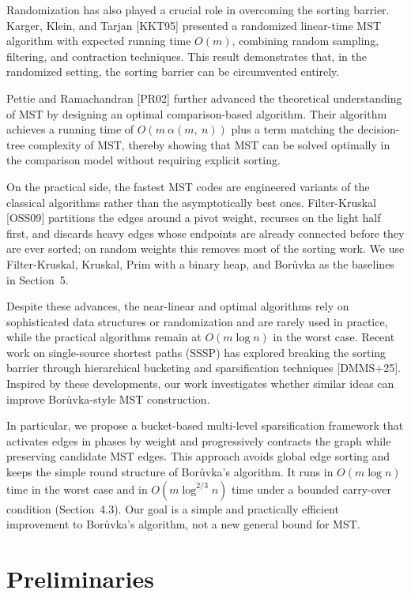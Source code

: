 \documentclass[11pt]{article}
\theoremstyle{plain}
\theoremstyle{remark}
\begin{document}
Randomization has also played a crucial role in overcoming the sorting
barrier. Karger, Klein, and Tarjan {[}KKT95{]} presented a randomized
linear-time MST algorithm with expected running time \(O(m)\), combining
random sampling, filtering, and contraction techniques. This result
demonstrates that, in the randomized setting, the sorting barrier can be
circumvented entirely.

Pettie and Ramachandran {[}PR02{]} further advanced the theoretical
understanding of MST by designing an optimal comparison-based algorithm.
Their algorithm achieves a running time of \(O(m\ \alpha(m,\ n))\) plus
a term matching the decision-tree complexity of MST, thereby showing
that MST can be solved optimally in the comparison model without
requiring explicit sorting.

On the practical side, the fastest MST codes are engineered variants of
the classical algorithms rather than the asymptotically best ones.
Filter-Kruskal {[}OSS09{]} partitions the edges around a pivot weight,
recurses on the light half first, and discards heavy edges whose
endpoints are already connected before they are ever sorted; on random
weights this removes most of the sorting work. We use Filter-Kruskal,
Kruskal, Prim with a binary heap, and Borůvka as the baselines in
Section~5.

Despite these advances, the near-linear and optimal algorithms rely on
sophisticated data structures or randomization and are rarely used in
practice, while the practical algorithms remain at \(O(m \log n)\) in
the worst case. Recent work on single-source shortest paths (SSSP) has
explored breaking the sorting barrier through hierarchical bucketing and
sparsification techniques {[}DMMS+25{]}. Inspired by these developments,
our work investigates whether similar ideas can improve Borůvka-style
MST construction.

In particular, we propose a bucket-based multi-level sparsification
framework that activates edges in phases by weight and progressively
contracts the graph while preserving candidate MST edges. This approach
avoids global edge sorting and keeps the simple round structure of
Borůvka's algorithm. It runs in \(O(m \log n)\) time in the worst case
and in \(O(m \log^{2/3} n)\) time under a bounded carry-over condition
(Section~4.3). Our goal is a simple and practically efficient
improvement to Borůvka's algorithm, not a new general bound for MST.

\section{Preliminaries}
\end{document}

